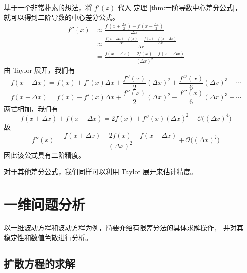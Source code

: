 \begin{solution}
    基于一个非常朴素的想法，将 $f'(x)$ 代入 
    定理 \ref{thm:一阶导数中心差分公式}，就可以得到二阶导数的中心差分公式。
    \begin{align*}
        f''(x)&\approx\frac{f'(x+\frac{\Delta x}{2})-f'(x-\frac{\Delta x}{2})}{\Delta x}\\
        &\approx\frac{\frac{f(x+\Delta x)-f(x)}{\Delta x}
            -\frac{f(x)-f(x-\Delta x)}{\Delta x}}{\Delta x}\\
        &=\frac{f(x+\Delta x)-2f(x)+f(x-\Delta x)}{(\Delta x)^2}
    \end{align*}
    由 Taylor 展开，我们有
    \begin{equation*}
        f(x+\Delta x)=f(x)+f'(x)\Delta x+\frac{f''(x)}{2}(\Delta x)^2
            +\frac{f'''(x)}{6}(\Delta x)^3+\cdots
    \end{equation*}
    \begin{equation*}
        f(x-\Delta x)=f(x)-f'(x)\Delta x+\frac{f''(x)}{2}(\Delta x)^2
            -\frac{f'''(x)}{6}(\Delta x)^3+\cdots
    \end{equation*}
    两式相加，我们有
    \begin{equation*}
        f(x+\Delta x)+f(x-\Delta x)=2f(x)+f''(x)(\Delta x)^2 
        +\mathcal{O}\Big((\Delta x)^4\Big)
    \end{equation*}
    故
    \begin{equation*}
        f''(x)=\frac{f(x+\Delta x)-2f(x)+f(x-\Delta x)}{(\Delta x)^2}
        +\mathcal{O}\Big((\Delta x)^2\Big)
    \end{equation*}
    因此该公式具有二阶精度。
\end{solution}

\par 对于其他差分公式，我们同样可以利用 Taylor 展开来估计精度。

\section{一维问题分析}

\par 以一维波动方程和波动方程为例，简要介绍有限差分法的具体求解操作，
并对其稳定性和数值色散进行分析。

\subsection{扩散方程的求解}

